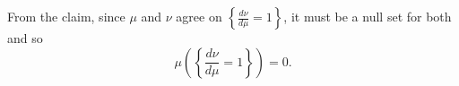 \documentclass[12pt]{Homework}
\begin{document}
\begin{solution}
From the claim, since $\mu$ and $\nu$ agree on $\left\{\frac{d\nu}{d\mu}=1\right\}$, it must be a null set for both and so  $$\mu\left(\left\{\frac{d\nu}{d\mu}=1\right\}\right)=0.$$

\begin{comment}
b/c $\nu<<\mu-\nu$ and $\mu-\nu<<\mu$, we have that $$f=\frac{d\nu}{d\mu}=\frac{d\nu}{d(\mu-\nu)}\frac{d(\mu-\nu)}{d\mu}=\frac{d\nu}{d(\mu-\nu)}\left(1-\frac{d\nu}{d\mu}\right)=\frac{d\nu}{d(\mu-\nu)}(1-f).$$

Now, $$(\mu-\nu)(E)=\int_Ed(\mu-\nu)=\int_E\frac{d(\mu-\nu)}{d\mu}d\mu\implies \frac{d(\mu-\nu)}{d\mu}>0$$ since $\mu-\nu$ is a positive measure. Furthermore, $$\int_Ed(\mu-\nu)=(\mu-\nu)(E)\le\mu(E)=\int_Ed\mu\implies \frac{d(\mu-\nu)}{d\mu}\le 1.$$ Since we already used that $$\frac{d(\mu-\nu)}{d\mu}=\frac{d\mu}{d\mu}-\frac{d\nu}{d\mu}=1-f$$ we have then that $$0<1-f\le 1\implies -1<-f\le 0\implies 0\le f<1.$$

Thus, $$\frac{d\nu}{d\mu}=f<1\qquad\mu\text{-a.e.}$$ and so  $$\mu\left(\left\{\frac{d\nu}{d\mu}=1\right\}\right)=0.$$
\end{comment}

\end{solution}
\vspace{0.5cm}
\end{document}
